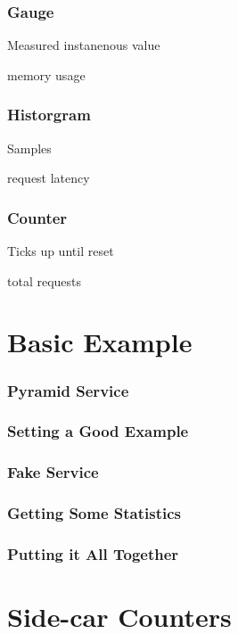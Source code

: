 \begin{frame}
\frametitle{Gauge}

Measured instanenous value\pause

memory usage

\end{frame}

\begin{frame}
\frametitle{Historgram}

Samples\pause

request latency

\end{frame}

\begin{frame}
\frametitle{Counter}

Ticks up until reset\pause

total requests

\end{frame}

\section{Basic Example}

\begin{frame}
\frametitle{Pyramid Service}
\end{frame}

\begin{frame}
\frametitle{Setting a Good Example}
\end{frame}

\begin{frame}
\frametitle{Fake Service}
\end{frame}

\begin{frame}
\frametitle{Getting Some Statistics}
\end{frame}

\begin{frame}
\frametitle{Putting it All Together}
\end{frame}

\section{Side-car Counters}

